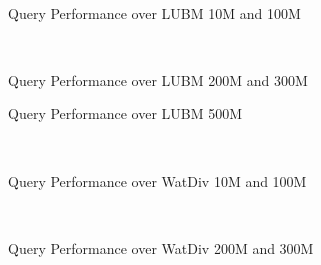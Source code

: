 \documentclass[titlepage, a4paper, 12pt] {article}
\begin{document}

\begin{figure}[t]%
	\subfigure[lubm10M]{%
		\resizebox{\columnwidth}{!}{
			
		}
		\label{fig:lubm10MPerformance}%
	}
	\\
	\subfigure[lubm100M]{%
		\resizebox{\columnwidth}{!}{
			
		}
		\label{fig:lubm100MPerformance}%
	}%
	\caption{Query Performance over LUBM 10M and 100M}%
	\label{fig:lubmPerformance1}
\end{figure}
	
\begin{figure}[t]%
		\subfigure[lubm200M]{%
			\resizebox{\columnwidth}{!}{
				
			}
			\label{fig:lubm200MPerformance}%
		}%
			\\
			\subfigure[lubm300M]{%
				\resizebox{\columnwidth}{!}{
					
				}
				\label{fig:lubm300MPerformance}%
			}%
	\caption{Query Performance over LUBM 200M and 300M}%
	\label{fig:lubmPerformance2}
\end{figure}

\begin{figure}[t]%
	\subfigure[lubm500M]{%
		\resizebox{\columnwidth}{!}{
			
		}
		\label{fig:lubm500MPerformance}%
	}%
	\caption{Query Performance over LUBM 500M}%
	\label{fig:lubmPerformance3}
\end{figure}

\begin{figure}[t]%
	\subfigure[watdiv10M]{%
		\resizebox{\columnwidth}{!}{
			
		}
		\label{fig:watdiv10MPerformance}%
	}%
	\\
	\subfigure[watdiv100M]{%
		\resizebox{\columnwidth}{!}{
			
		}
		\label{fig:watdiv100MPerformance}%
	}%
	\caption{Query Performance over WatDiv 10M and 100M}%
	\label{fig:watdivPerformance1}
\end{figure}
	
	\begin{figure}[t]%
	\subfigure[watdiv200M]{%
		\resizebox{\columnwidth}{!}{
			
		}
		\label{fig:watdiv200MPerformance}%
	}%
	\\
	\subfigure[watdiv300M]{%
		\resizebox{\columnwidth}{!}{
			
		}
		\label{fig:watdiv300MPerformance}%
	}%
	\caption{Query Performance over WatDiv 200M and 300M}%
	\label{fig:watdivPerformance2}
\end{figure}
\end{document}
